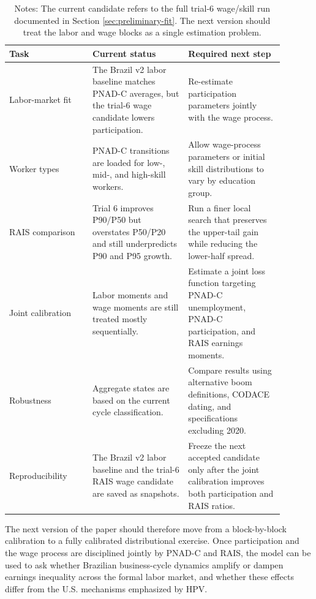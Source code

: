 \documentclass[12pt]{article}
\begin{document}
	\begin{table}[H]
		\centering
		\caption{Remaining Work After the Current Brazil Candidate}
		\label{tab:remaining-work-current-candidate}
		\small
		\begin{tabular}{p{0.27\linewidth}p{0.31\linewidth}p{0.31\linewidth}}
			\toprule
			Task & Current status & Required next step \\
			\midrule
			Labor-market fit & The Brazil v2 labor baseline matches PNAD-C averages, but the trial-6 wage candidate lowers participation. & Re-estimate participation parameters jointly with the wage process. \\
			Worker types & PNAD-C transitions are loaded for low-, mid-, and high-skill workers. & Allow wage-process parameters or initial skill distributions to vary by education group. \\
			RAIS comparison & Trial 6 improves P90/P50 but overstates P50/P20 and still underpredicts P90 and P95 growth. & Run a finer local search that preserves the upper-tail gain while reducing the lower-half spread. \\
			Joint calibration & Labor moments and wage moments are still treated mostly sequentially. & Estimate a joint loss function targeting PNAD-C unemployment, PNAD-C participation, and RAIS earnings moments. \\
			Robustness & Aggregate states are based on the current cycle classification. & Compare results using alternative boom definitions, CODACE dating, and specifications excluding 2020. \\
			Reproducibility & The Brazil v2 labor baseline and the trial-6 RAIS wage candidate are saved as snapshots. & Freeze the next accepted candidate only after the joint calibration improves both participation and RAIS ratios. \\
			\bottomrule
		\end{tabular}
		\caption*{Notes: The current candidate refers to the full trial-6 wage/skill run documented in Section \ref{sec:preliminary-fit}. The next version should treat the labor and wage blocks as a single estimation problem.}
	\end{table}

	The next version of the paper should therefore move from a block-by-block calibration to a fully calibrated distributional exercise. Once participation and the wage process are disciplined jointly by PNAD-C and RAIS, the model can be used to ask whether Brazilian business-cycle dynamics amplify or dampen earnings inequality across the formal labor market, and whether these effects differ from the U.S. mechanisms emphasized by HPV.
	
\end{document}
